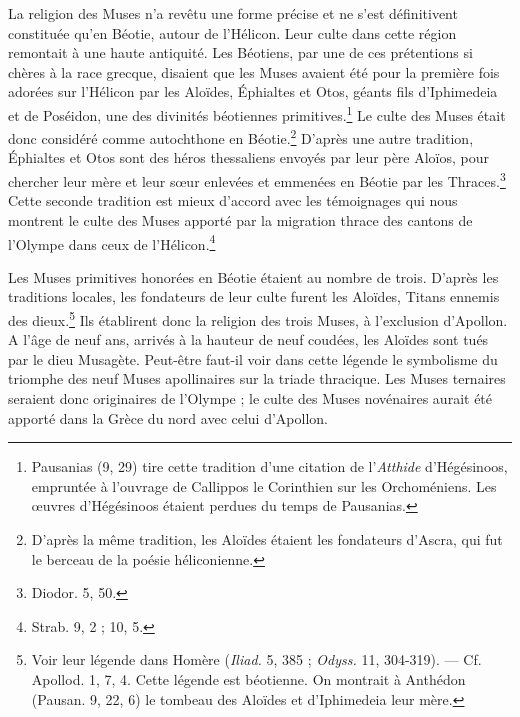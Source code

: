 \documentclass[landscape, a4paper, 11pt, oneside, polutonikogreek, french]{article}
\begin{document}
La religion des Muses n'a revêtu une forme précise et ne s'est définitivent constituée qu'en Béotie, autour de l'Hélicon. Leur culte dans cette région remontait à une haute antiquité. Les Béotiens, par une de ces prétentions si chères à la race grecque, disaient que les Muses avaient été pour la première fois adorées sur l'Hélicon par les Aloïdes, Éphialtes et Otos, géants fils d'Iphimedeia et de Poséidon, une des divinités béotiennes primitives.\footnote{Pausanias (9, 29) tire cette tradition d'une citation de l'\emph{Atthide} d'Hégésinoos, empruntée à l'ouvrage de Callippos le Corinthien sur les Orchoméniens. Les œuvres d'Hégésinoos étaient perdues du temps de Pausanias.} Le culte des Muses était donc considéré comme autochthone en Béotie.\footnote{D'après la même tradition, les Aloïdes étaient les fondateurs d'Ascra, qui fut le berceau de la poésie héliconienne.} D'après une autre tradition, Éphialtes et Otos sont des héros thessaliens envoyés par leur père Aloïos, pour chercher leur mère et leur sœur enlevées et emmenées en Béotie par les Thraces.\footnote{Diodor. 5, 50.} Cette seconde tradition est mieux d'accord avec les témoignages qui nous montrent le culte des Muses apporté par la migration thrace des cantons de l'Olympe dans ceux de l'Hélicon.\footnote{Strab. 9, 2 ; 10, 5.}

Les Muses primitives honorées en Béotie étaient au nombre de trois. D'après les traditions locales, les fondateurs de leur culte furent les Aloïdes, Titans ennemis des dieux.\footnote{Voir leur légende dans Homère (\emph{Iliad.} 5, 385 ; \emph{Odyss.} 11, 304-319). --- Cf. Apollod. 1, 7, 4. Cette légende est béotienne. On montrait à Anthédon (Pausan. 9, 22, 6) le tombeau des Aloïdes et d'Iphimedeia leur mère.} Ils établirent donc la religion des trois Muses, à l'exclusion d'Apollon. A l'âge de neuf ans, arrivés à la hauteur de neuf coudées, les Aloïdes sont tués par le dieu Musagète. Peut-être faut-il voir dans cette légende le symbolisme du triomphe des neuf Muses apollinaires sur la triade thracique. Les Muses ternaires seraient donc originaires de l'Olympe ; le culte des Muses novénaires aurait été apporté dans la Grèce du nord avec celui d'Apollon.
\end{document}
